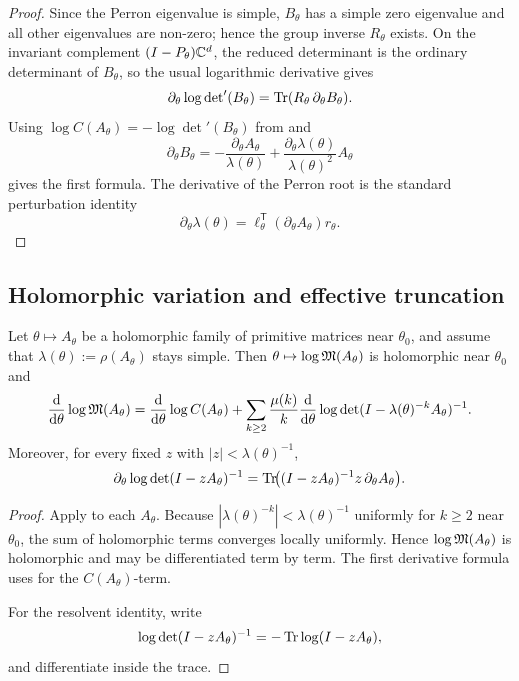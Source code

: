 \begin{proof}
  Since the Perron eigenvalue is simple, \(B_\theta\) has a simple zero
  eigenvalue and all other eigenvalues are non-zero; hence the group
  inverse \(R_\theta\) exists. On the invariant complement
  \((I-P_\theta)\mathbb{C}^d\), the reduced determinant is the ordinary
  determinant of \(B_\theta\), so the usual logarithmic derivative gives
  \[
    \partial_\theta \log\det\nolimits'(B_\theta)
    =\operatorname{Tr}(R_\theta\,\partial_\theta B_\theta).
  \]
  Using \(\log C(A_\theta)=-\log\det\nolimits'(B_\theta)\) from
   and
  \[
    \partial_\theta B_\theta
    =-\frac{\partial_\theta A_\theta}{\lambda(\theta)}
      +\frac{\partial_\theta\lambda(\theta)}{\lambda(\theta)^2}A_\theta
  \]
  gives the first formula. The derivative of the Perron root is the
  standard perturbation identity
  \[
    \partial_\theta\lambda(\theta)
    =\ell_\theta^{\mathsf T}(\partial_\theta A_\theta)r_\theta.
  \]
\end{proof}

\subsection{Holomorphic variation and effective truncation}

\begin{theorem}
  \label{thm:logM-holomorphic-variation}
  Let \(\theta\mapsto A_\theta\) be a holomorphic family of primitive
  matrices near \(\theta_0\), and assume that
  \(\lambda(\theta):=\rho(A_\theta)\) stays simple. Then
  \(\theta\mapsto\log\mathfrak{M}(A_\theta)\) is holomorphic near \(\theta_0\) and
  \[
    \frac{\mathrm{d}}{\mathrm{d}\theta}\log\mathfrak{M}(A_\theta)
    =\frac{\mathrm{d}}{\mathrm{d}\theta}\log C(A_\theta)
     +\sum_{k\ge 2}\frac{\mu(k)}{k}
      \frac{\mathrm{d}}{\mathrm{d}\theta}
      \log\det(I-\lambda(\theta)^{-k}A_\theta)^{-1}.
  \]
  Moreover, for every fixed \(z\) with \(|z|<\lambda(\theta)^{-1}\),
  \[
    \partial_\theta\log\det(I-zA_\theta)^{-1}
    =\operatorname{Tr}\!\bigl((I-zA_\theta)^{-1}z\,\partial_\theta A_\theta\bigr).
  \]
\end{theorem}

\begin{proof}
  Apply  to each \(A_\theta\).
  Because \(|\lambda(\theta)^{-k}|<\lambda(\theta)^{-1}\) uniformly for
  \(k\ge 2\) near \(\theta_0\), the sum of holomorphic terms converges
  locally uniformly. Hence \(\log\mathfrak{M}(A_\theta)\) is holomorphic and may
  be differentiated term by term. The first derivative formula uses
   for
  the \(C(A_\theta)\)-term.

  For the resolvent identity, write
  \[
    \log\det(I-zA_\theta)^{-1}=-\operatorname{Tr}\log(I-zA_\theta),
  \]
  and differentiate inside the trace.
\end{proof}

